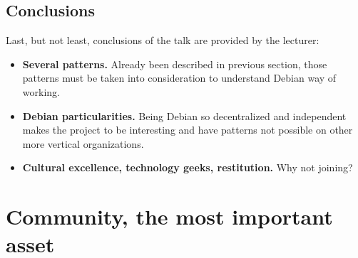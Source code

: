 \documentclass[11pt]{article}
\begin{document}
\subsection{Conclusions}
Last, but not least, conclusions of the talk are provided by the lecturer:
\begin{itemize}\itemsep0pt
\item{\textbf{Several patterns.}} Already been described in previous section, those patterns must be taken into consideration to understand Debian way of working.
\item{\textbf{Debian particularities.}} Being Debian so decentralized and independent makes the project to be interesting and have patterns not possible on other more vertical organizations.
\item{\textbf{Cultural excellence, technology geeks, restitution.}} Why not joining?
\end{itemize}

\pagebreak

\section{Community, the most important asset}
\end{document}
